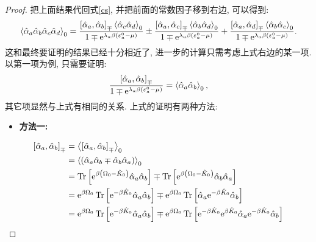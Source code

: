 \begin{proof}
把上面结果代回式\eqref{cs}, 并把前面的常数因子移到右边, 可以得到:
\begin{equation}
\left\langle\hat{\alpha}_a \hat{\alpha}_b \hat{\alpha}_c \hat{\alpha}_d\right\rangle_0=\frac{\left[\hat{\alpha}_a, \hat{\alpha}_b\right]_{\mp}\left\langle\hat{\alpha}_c \hat{\alpha}_d\right\rangle_0}{1 \mp \mathrm{e}^{\lambda_a \beta\left(\varepsilon_a^0-\mu\right)}} \pm \frac{\left[\hat{\alpha}_a, \hat{\alpha}_c\right]_{\mp}\left\langle\hat{\alpha}_b \hat{\alpha}_d\right\rangle_0}{1 \mp \mathrm{e}^{\lambda_a \beta\left(\varepsilon_a^0-\mu\right)}}+\frac{\left[\hat{\alpha}_a, \hat{\alpha}_d\right]_{\mp}\left\langle\hat{\alpha}_b \hat{\alpha}_c\right\rangle_0}{1 \mp \mathrm{e}^{\lambda_a \beta\left(\varepsilon_a^0-\mu\right)}} .
\end{equation}
这和最终要证明的结果已经十分相近了, 进一步的计算只需考虑上式右边的某一项. 以第一项为例, 只需要证明:
\begin{equation}\label{fin}
\frac{\left[\hat{\alpha}_a, \hat{\alpha}_b\right]_{\mp}}{1 \mp \mathrm{e}^{\lambda_a \beta\left(\varepsilon_a^0-\mu\right)}}=\left\langle\hat{\alpha}_a \hat{\alpha}_b\right\rangle_0,
\end{equation}
其它项显然与上式有相同的关系. 上式的证明有两种方法:
\begin{itemize}
\item \textbf{方法一:}
\end{itemize}
\begin{align}
{\left[\hat{\alpha}_a, \hat{\alpha}_b\right]_{\mp} } & =\left\langle\left[\hat{\alpha}_a, \hat{\alpha}_b\right]_{\mp}\right\rangle_0 \nonumber\\
& =\left\langle\left(\hat{\alpha}_a \hat{\alpha}_b \mp \hat{\alpha}_b \hat{\alpha}_a\right)\right\rangle_0\nonumber \\
& =\operatorname{Tr}\left[\e^{\beta\left(\Omega_0-\hat{K}_0\right)} \hat{\alpha}_a \hat{\alpha}_b\right] \mp \operatorname{Tr}\left[\e^{\beta\left(\Omega_0-\hat{K}_0\right)} \hat{\alpha}_b \hat{\alpha}_a\right] \nonumber\\
& =\e^{\beta \Omega_0} \operatorname{Tr}\left[\e^{-\beta \hat{K}_0} \hat{\alpha}_a \hat{\alpha}_b\right] \mp \e^{\beta \Omega_0} \operatorname{Tr}\left[\hat{\alpha}_a \e^{-\beta \hat{K}_0} \hat{\alpha}_b\right]\nonumber \\
& =\e^{\beta \Omega_0} \operatorname{Tr}\left[\e^{-\beta \hat{K}_0} \hat{\alpha}_a \hat{\alpha}_b\right] \mp \e^{\beta \Omega_0} \operatorname{Tr}\left[\e^{-\beta \hat{K}_0} \e^{\beta \hat{K}_0} \hat{\alpha}_a \e^{-\beta \hat{K}_0} \hat{\alpha}_b\right] \nonumber\\

\end{align}
\end{proof}
